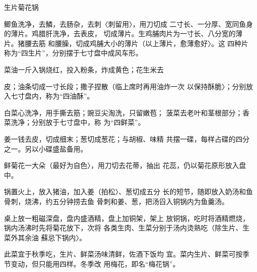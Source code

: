 \begin{recipe}{生片菊花锅}

\ingredients



\cooking

\step 	鲫鱼洗净，去鱗，去肠杂，去刺〈刺留用〉，用刀切成 二寸长、一分厚、宽同鱼身的薄片。鸡腊肝洗净，去表皮， 切成薄片。生鸡脯肉片为一寸长、八分宽的薄片。猪腰去筋 和腰臊，切成鸡脯大小的薄片（以上薄片，愈薄愈好〉。这 四种片称为“四生片”，分别摆于七寸盘中成风车形。

\step 	菜油一斤入锅烧红，投入粉条，炸成黄色；花生米去

皮；油条切成一寸长段；撒子捏散（临上席时再用油炸一次 以保持酥脆〉；分别放入七寸盘内，称为“四油酥”。

白菜心洗净，用手撕去筋；豌豆尖淘洗，只留嫩苞； 菠菜去老叶和茎根部分；香菜洗净；分别放于七寸盘中，称 为“四鲜菜”。

\step 	姜一钱去皮，切成细末；葱切成葱花；与胡椒、味精 共摆一碟，每样占碟的四分之一。另以小碟盛盐备用。

\step 	鲜菊花一大朵（最好为自色〉，用刀切去花蒂，抽出 花蕊，仍以菊花原形放入盘中。

\step 	锅置火上，放入猪油，加入姜（拍松〉、葱切成五分 长的短节，随即放入奶汤和鱼骨刺，烧沸，约五分钟捞去鱼 骨刺和姜、葱，把汤舀入铜锅内为鱼羹汤。

\step 	桌上放一粗磁深盘，盘内盛酒精，盘上加铜架，架上 放铜锅，吃时将酒精燃烧，锅内汤沸时先将菊花放下，次将 各类生肉、生菜分别于汤内烫熟吃（除生片、生菜外其余油 蘇忌下锅内〉。

\notes

此菜宜于秋季吃，生片、鲜菜汤味清鲜，佐酒下饭均 宜。菜内生片、鲜菜可按季节变动，但只能用四样。冬季改 用梅花，即名“梅花锅”。

\end{recipe}

